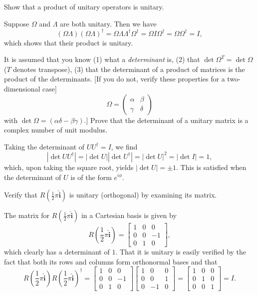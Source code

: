 \documentclass[../principles-of-quantum-mechanics.tex]{subfiles}
\begin{document}
\begin{questions}
\question Show that a product of unitary operators is unitary.

\begin{solution}
	Suppose $\Omega$ and $\Lambda$ are both unitary. Then we have
	\[
		(\Omega\Lambda)(\Omega\Lambda)^\dagger = \Omega\Lambda\Lambda^\dagger\Omega^\dagger = \Omega{I}\Omega^\dagger = \Omega\Omega^\dagger = I,
	\]
	which shows that their product is unitary.
\end{solution}

\question It is assumed that you know (1) what a \textit{determinant} is, (2) that $\det\Omega^T=\det\Omega$ ($T$ denotes transpose), (3) that the determinant of a product of matrices is the product of the determinants. [If you do not, verify these properties for a two-dimensional case]
\[
	\Omega = \begin{pmatrix}\alpha & \beta \\ \gamma & \delta\end{pmatrix}
\]
with $\det\Omega=(\alpha\delta-\beta\gamma)$.] Prove that the determinant of a unitary matrix is a complex number of unit modulus.

\begin{solution}
	Taking the determinant of $UU^\dagger=I$, we find
	\[
	|\det{UU^\dagger}| = |\det{U}||\det{U}^\dagger| = |\det{U}|^2 = |\det{I}| = 1,
	\]
	which, upon taking the square root, yields $|\det{U}|=\pm{1}$. This is satisfied when the determinant of $U$ is of the form $e^{i\phi}$.
\end{solution}

\question Verify that $R(\frac{1}{2}\pi\mathbf{\hat{i}})$ is unitary (orthogonal) by examining its matrix.

\begin{solution}
	The matrix for $R(\frac{1}{2}\pi\mathbf{\hat{i}})$ in a Cartesian basis is given by
	\[
		R(\frac{1}{2}\pi\mathbf{\hat{i}}) = \begin{bmatrix} 1 & 0 & 0 \\ 0 & 0 & -1 \\ 0 & 1 & 0 \end{bmatrix},
	\]
	which clearly has a determinant of $1$. That it is unitary is easily verified by the fact that both its rows and columns form orthonormal bases and that
	\[
		R(\frac{1}{2}\pi\mathbf{\hat{i}})R(\frac{1}{2}\pi\mathbf{\hat{i}})^\dagger = \begin{bmatrix} 1 & 0 & 0 \\ 0 & 0 & -1 \\ 0 & 1 & 0\end{bmatrix}\begin{bmatrix}1 & 0 & 0 \\ 0 & 0 & 1 \\ 0 & -1 & 0\end{bmatrix} = \begin{bmatrix}1 & 0 & 0 \\ 0 & 1 & 0 \\ 0 & 0 & 1\end{bmatrix} = I.
	\]
\end{solution}


\end{questions}
\end{document}

